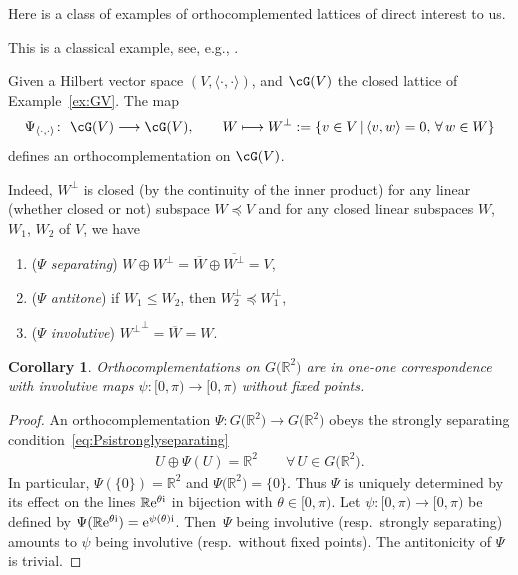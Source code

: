 \documentclass[pdftex]{sigma}
\numberwithin{equation}{section}
\newtheorem{Corollary}[Theorem]{Corollary}
\newcommand{\R}{\mathbb{R}}
\newcommand{\pone}{separating\xspace }
\begin{document}
Here is a class of examples of orthocomplemented lattices of direct interest to us.
\begin{Example}%
This is a classical example, see, e.g., \cite[below Definition 1.4]{CM}.
	
	Given a Hilbert vector space $(V, \langle\cdot, \cdot\rangle)$,
	and $\cG(V)$ the closed \subsp lattice of Example~\ref{ex:GV}. The map
	\begin{gather*}%
	\Psi_{\langle\cdot, \cdot\rangle}\colon \ \cG(V) \longrightarrow \cG(V),\qquad
	W\longmapsto W^\perp:=\{v\in V\,|\, \langle v, w\rangle=0,\, \forall\, w\in W\}
	\end{gather*}
	defines an orthocomplementation on $\cG(V)$.
	
	Indeed, $W^\perp$ is closed (by the continuity of the inner product) for any linear (whether closed or not) subspace $W\preceq V$ and for any closed linear subspaces $W$, $W_1$, $W_2$ of $V$, we have
	\begin{enumerate}\itemsep=0pt
	\item[$(a)$] ({\it $\Psi$ \pone}) {$W\oplus W^\perp =\overline W\oplus \overline{W^\perp}=V$},
	\item[$(b)$] ({\it $\Psi$ antitone}) if $W_1\leq W_2$, then $W_2^\perp\preceq W_1^\perp$,
	\item[$(c)$]
		({\it $\Psi$ involutive}) ${W^\perp}^\perp=\overline W=W$.
	\end{enumerate}
\end{Example}
\begin{Corollary}\label{coro:PsiR2}
Orthocomplementations on $G\big(\R^2\big)$ are in one-one correspondence with involutive maps $\psi\colon [0, \pi)\to [0, \pi)$ without fixed points.
\end{Corollary}
\begin{proof}
An orthocomplementation $\Psi\colon G\big(\R^2\big)\rightarrow G\big(\R^2\big)$ obeys the strongly separating condition~\eqref{eq:Psistronglyseparating}
\begin{gather*}
U\oplus \Psi(U) =\R^2 \qquad \forall\, U\in G\big(\R^2\big).
\end{gather*}
	In particular, $\Psi (\{0\})=\R^2$ and $\Psi\big(\R^2\big)=\{0\}$. Thus $\Psi$ is uniquely determined by its effect on the lines $\R {\rm e}^{\theta {\rm i}}$ in bijection with $\theta\in [0,\pi)$. Let $\psi\colon [0,\pi)\to [0,\pi)$ be defined by $\Psi(\R {\rm e}^{\theta {\rm i}})={\rm e}^{\psi(\theta){\rm i}}$. Then~$\Psi$ being involutive (resp.~strongly separating) amounts to $\psi$ being involutive (resp.~without fixed points). The antitonicity of $\Psi$ is trivial.
\end{proof}
\end{document}
